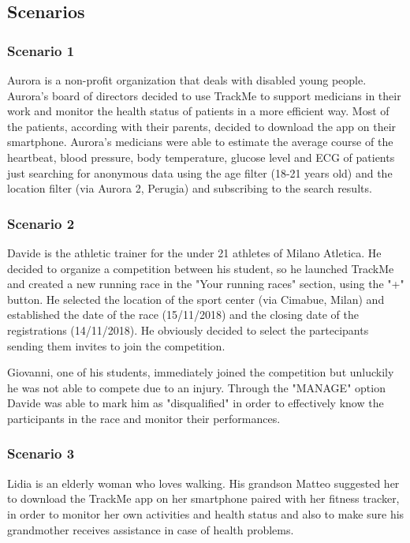 \subsection{Scenarios}
\subsubsection{Scenario 1}
Aurora is a non-profit organization that deals with disabled young people. Aurora's board of directors decided to use TrackMe to support medicians in their work and monitor the health status of patients in a more efficient way. Most of the patients, according with their parents, decided to download the app on their smartphone. Aurora's medicians were able to estimate the average course of the heartbeat, blood pressure, body temperature, glucose level and ECG of patients just searching for anonymous data using the age filter (18-21 years old) and the location filter (via Aurora 2, Perugia) and subscribing to the search results.

\subsubsection{Scenario 2}
Davide is the athletic trainer for the under 21 athletes of Milano Atletica. He decided to organize a competition between his student, so he launched TrackMe and created a new running race in the "Your running races" section, using the "+" button. He selected the location of the sport center (via Cimabue, Milan) and established the date of the race (15/11/2018) and the closing date of the registrations (14/11/2018). He obviously decided to select the partecipants sending them invites to join the competition.

Giovanni, one of his students, immediately joined the competition but unluckily he was not able to compete due to an injury. Through the "MANAGE" option Davide was able to mark him as "disqualified" in order to effectively know the participants in the race and monitor their performances.

\subsubsection{Scenario 3}
Lidia is an elderly woman who loves walking. His grandson Matteo suggested her to download the TrackMe app on her smartphone paired with her fitness tracker, in order to monitor her own activities and health status and also to make sure his grandmother receives assistance in case of health problems.

